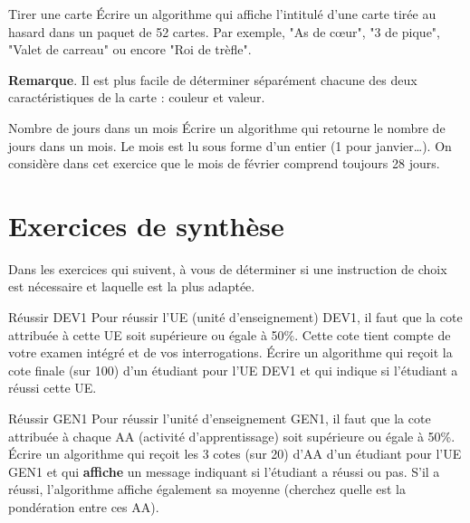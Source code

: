 	\begin{Exercice}{Tirer une carte}
		Écrire un algorithme qui affiche l’intitulé d’une carte
		tirée au hasard dans un paquet de 52 cartes.
		Par exemple, "As de cœur", "3 de pique", "Valet de carreau"
		ou encore "Roi de trèfle".
		
		\textbf{Remarque}. Il est plus facile de déterminer séparément
		chacune des deux caractéristiques de la carte : couleur et valeur.
	\end{Exercice}
	
	\begin{Exercice}{Nombre de jours dans un mois}
		Écrire un algorithme qui retourne le nombre de jours dans un mois. 
		Le mois est lu sous forme d’un entier (1 pour janvier\dots).
		On considère dans cet exercice que le mois de février
		comprend toujours 28 jours.
	\end{Exercice}
		
\section{Exercices de synthèse}

	Dans les exercices qui suivent,
	à vous de déterminer si une instruction de choix est nécessaire
	et laquelle est la plus adaptée.

	\begin{Exercice}{Réussir DEV1}
		Pour réussir l’UE (unité d’enseignement) DEV1,
		il faut que la cote attribuée à cette UE 
		soit supérieure ou égale à 50\%.
		Cette cote tient compte de votre examen intégré
		et de vos interrogations.
		Écrire un algorithme 
		qui reçoit la cote finale (sur 100)
		d’un étudiant pour l’UE DEV1
		et qui indique si l’étudiant a réussi cette UE.
	\end{Exercice}		

	\begin{Exercice}{Réussir GEN1}
		\label{algo:réussirGEN1}
		Pour réussir l’unité d’enseignement GEN1,
		il faut que la cote attribuée à chaque AA (activité d’apprentissage)
		soit supérieure ou égale à 50\%.
		Écrire un algorithme qui reçoit les 3 cotes (sur 20) d’AA d’un étudiant
		pour l’UE GEN1 et qui \textbf{affiche} un message
		indiquant si l’étudiant a réussi ou pas.
		S’il a réussi, l’algorithme affiche également sa moyenne
		(cherchez quelle est la pondération entre ces AA).
	\end{Exercice}		
	
